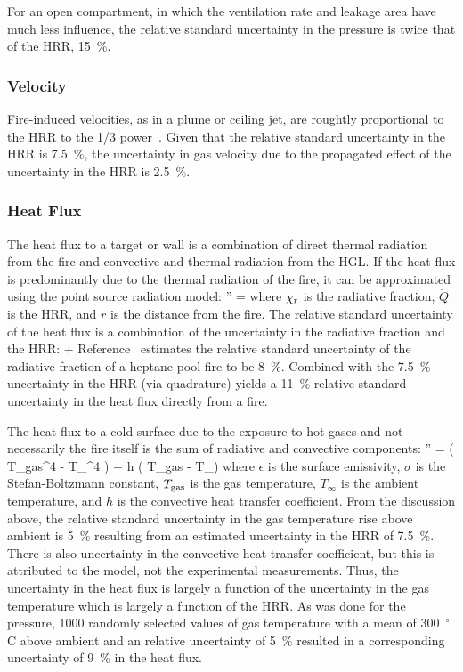 For an open compartment, in which the ventilation rate and leakage area have much less influence, the relative standard uncertainty in the pressure is twice that of the HRR, 15~\%.

\subsubsection{Velocity}

Fire-induced velocities, as in a plume or ceiling jet, are roughtly proportional to the HRR to the 1/3 power~\cite{SFPE:Alpert}. Given that the relative standard uncertainty in the HRR is 7.5~\%, the uncertainty in gas velocity due to the propagated effect of the uncertainty in the HRR is 2.5~\%.

\subsubsection{Heat Flux}

The heat flux to a target or wall is a combination of direct thermal radiation from the fire and convective and thermal radiation from the HGL. If the heat flux is predominantly due to the thermal radiation of the fire, it can be approximated using the point source radiation model:
\be
   '' = 
\ee
where $\chi_{\rm r}$ is the radiative fraction, $\dot{Q}$ is the HRR, and $r$ is the distance from the fire. The relative standard uncertainty of the heat flux is a combination of the uncertainty in the radiative fraction and the HRR:
\be
    \approx {} + 
\ee
Reference~\cite{Hamins:SP1013-1} estimates the relative standard uncertainty of the radiative fraction of a heptane pool fire to be 8~\%. Combined with the 7.5~\% uncertainty in the HRR (via quadrature) yields a 11~\% relative standard uncertainty in the heat flux directly from a fire.

The heat flux to a cold surface due to the exposure to hot gases and not necessarily the fire itself is the sum of radiative and convective components:
\be
   '' = \epsilon \sigma \left( T_{\rm gas}^4 - T_\infty^4 \right) + h \left( T_{\rm gas} - T_\infty \right)
\ee
where $\epsilon$ is the surface emissivity, $\sigma$ is the Stefan-Boltzmann constant, $T_{\rm gas}$  is the gas temperature, $T_\infty$ is the ambient temperature, and $h$ is the convective heat transfer coefficient. From the discussion above, the relative standard uncertainty in the gas temperature rise above ambient is 5~\% resulting from an estimated uncertainty in the HRR of 7.5~\%. There is also uncertainty in the convective heat transfer coefficient, but this is attributed to the model, not the experimental measurements. Thus, the uncertainty in the heat flux is largely a function of the uncertainty in the gas temperature which is largely a function of the HRR. As was done for the pressure, 1000 randomly selected values of gas temperature with a mean of 300~$^\circ$C above ambient and an relative uncertainty of 5~\% resulted in a corresponding uncertainty of 9~\% in the heat flux.

